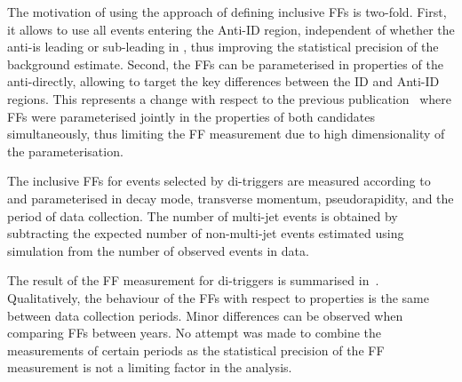 {  %


  The motivation of using the approach of defining inclusive FFs is
  two-fold. First, it allows to use all events entering the Anti-ID region,
  independent of whether the anti-\tauhadvis is leading or sub-leading in \pT,
  thus improving the statistical precision of the background estimate. Second,
  the FFs can be parameterised in properties of the anti-\tauhadvis directly,
  allowing to target the key differences between the ID and Anti-ID
  regions. This represents a change with respect to the previous
  publication~\cite{HIGG-2016-16-witherratum} where FFs were parameterised
  jointly in the properties of both \tauhadvis candidates simultaneously, thus
  limiting %
  the FF measurement due to high dimensionality of the parameterisation.}

The inclusive FFs for events selected by di-\tauhadvis triggers are measured
according to~ and parameterised in \tauhadvis
decay mode, transverse momentum, pseudorapidity, and the period of data
collection. The number of multi-jet events is obtained by subtracting the
expected number of non-multi-jet events estimated using simulation from the
number of observed events in data.

The result of the FF measurement for di-\tauhadvis triggers is summarised
in~. Qualitatively, the behaviour of the FFs with
respect to \tauhadvis properties is the same between data collection
periods. Minor differences can be observed when comparing FFs between years. No
attempt was made to combine the measurements of certain periods as the
statistical precision of the FF measurement is not a limiting factor in the
analysis.

